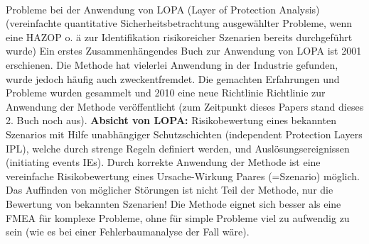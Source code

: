 \paragraph*{\cite{Bridges_2010}} Probleme bei der Anwendung von LOPA (Layer of Protection Analysis) (vereinfachte quantitative Sicherheitsbetrachtung ausgew\"ahlter Probleme, wenn eine HAZOP o. \"a zur Identifikation risikoreicher Szenarien bereits durchgef\"uhrt wurde) \hfill \newline
Ein erstes Zusammenh\"angendes Buch zur Anwendung von LOPA ist 2001 erschienen. Die Methode hat vielerlei Anwendung in der Industrie gefunden, wurde jedoch h\"aufig auch zweckentfremdet. Die gemachten Erfahrungen und Probleme wurden gesammelt und 2010 eine neue Richtlinie Richtlinie zur Anwendung der Methode ver\"offentlicht (zum Zeitpunkt dieses Papers stand dieses 2. Buch noch aus).
\textbf{Absicht von LOPA:} Risikobewertung eines bekannten Szenarios mit Hilfe unabh\"angiger Schutzschichten (independent Protection Layers IPL), welche durch strenge Regeln definiert werden, und Ausl\"osungsereignissen (initiating events IEs). Durch korrekte Anwendung der Methode ist eine vereinfache Risikobewertung eines Ursache-Wirkung Paares (=Szenario) m\"oglich. Das Auffinden von m\"oglicher St\"orungen ist nicht Teil der Methode, nur die Bewertung von bekannten Szenarien! Die Methode eignet sich besser als eine FMEA f\"ur komplexe Probleme, ohne f\"ur simple Probleme viel zu aufwendig zu sein (wie es bei einer Fehlerbaumanalyse der Fall w\"are). 
